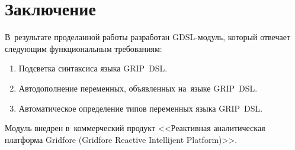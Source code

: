 \chapter*{Заключение}                       %

В~результате проделанной работы разработан GDSL-модуль, который отвечает следующим функциональным требованиям:

\begin{enumerate} 
	\item{Подсветка синтаксиса языка GRIP~DSL.}
	\item{Автодополнение переменных, объявленных на~языке GRIP~DSL.}
	\item{Автоматическое определение типов переменных языка GRIP~DSL.}
\end{enumerate} 

Модуль внедрен в~коммерческий продукт <<Реактивная аналитическая платформа Gridfore (Gridfore Reactive Intellijent Platform)>>. 